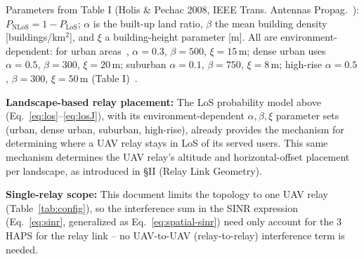 \documentclass[conference]{IEEEtran}
\begin{document}
\noindent Parameters from Table I (Holis \& Pechac 2008, IEEE Trans. Antennas Propag.~\cite{holispechac2008}): $P_\mathrm{NLoS}=1-P_\mathrm{LoS}$; $\alpha$ is the built-up land ratio,
$\beta$ the mean building density [buildings/km$^2$], and $\xi$ a building-height parameter [m]. All are
environment-dependent: for urban areas~\cite{holispechac2008},
$\alpha=0.3$, $\beta=500$, $\xi=15$\,m; dense urban uses $\alpha=0.5$, $\beta=300$, $\xi=20$\,m;
suburban $\alpha=0.1$, $\beta=750$, $\xi=8$\,m; high-rise $\alpha=0.5$, $\beta=300$, $\xi=50$\,m (Table I)~\cite{holispechac2008}.

\noindent\textbf{Landscape-based relay placement:} The LoS probability model above (Eq.~\eqref{eq:los}--\eqref{eq:losJ}), with its environment-dependent $\alpha,\beta,\xi$ parameter sets (urban, dense urban, suburban, high-rise), already provides the mechanism for determining where a UAV relay stays in LoS of its served users. This same mechanism determines the UAV relay's altitude and horizontal-offset placement per landscape, as introduced in \S II (Relay Link Geometry).

\noindent\textbf{Single-relay scope:} This document limits the topology to one UAV relay (Table~\ref{tab:config}), so the interference sum in the SINR expression (Eq.~\eqref{eq:sinr}, generalized as Eq.~\eqref{eq:spatial-sinr}) need only account for the 3 HAPS for the relay link -- no UAV-to-UAV (relay-to-relay) interference term is needed.
\end{document}
